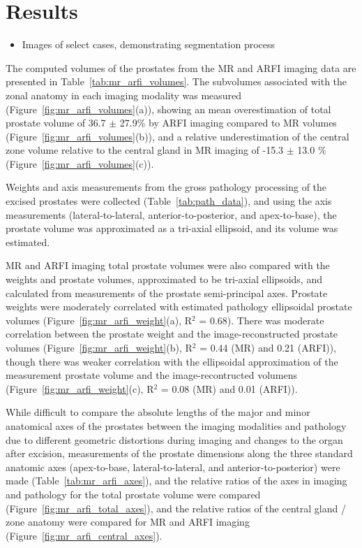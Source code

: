\section{Results}\label{sect:results}

\begin{itemize}
    \item Images of select cases, demonstrating segmentation process
\end{itemize}

The computed volumes of the prostates from the MR and ARFI imaging data are
presented in Table~\ref{tab:mr_arfi_volumes}.  The subvolumes associated
with the zonal anatomy in each imaging modality was measured
(Figure~\ref{fig:mr_arfi_volumes}(a)), showing an mean overestimation of
total prostate volume of 36.7 $\pm$ 27.9\% by ARFI imaging compared to MR
volumes (Figure~\ref{fig:mr_arfi_volumes}(b)), and a relative
underestimation of the central zone volume relative to the central gland in MR
imaging of -15.3 $\pm$ 13.0 \% (Figure~\ref{fig:mr_arfi_volumes}(c)).





Weights and axis measurements from the gross pathology processing of the
excised prostates were collected (Table~\ref{tab:path_data}), and using the
axis measurements (lateral-to-lateral, anterior-to-posterior, and
apex-to-base), the prostate volume was approximated as a tri-axial ellipsoid,
and its volume was estimated.



MR and ARFI imaging total prostate volumes were also compared with the weights
and prostate volumes, approximated to be tri-axial ellipsoids, and calculated
from measurements of the prostate semi-principal axes.  Prostate weights were
moderately correlated with estimated pathology ellipsoidal prostate volumes
(Figure~\ref{fig:mr_arfi_weight}(a), R$^2$ = 0.68).  There was moderate
correlation between the prostate weight and the image-reconstructed prostate
volumes (Figure~\ref{fig:mr_arfi_weight}(b), R$^2$ = 0.44 (MR) and 0.21
(ARFI)), though there was weaker correlation with the ellipsoidal approximation
of the measurement prostate volume and the image-recontructed volumens
(Figure~\ref{fig:mr_arfi_weight}(c), R$^2$ = 0.08 (MR) and 0.01 (ARFI)).  



While difficult to compare the absolute lengths of the major and minor
anatomical axes of the prostates between the imaging modalities and pathology
due to different geometric distortions during imaging and changes to the organ
after excision, measurements of the prostate dimensions along the three
standard anatomic axes (apex-to-base, lateral-to-lateral, and
anterior-to-posterior) were made (Table~\ref{tab:mr_arfi_axes}), and the
relative ratios of the axes in imaging and pathology for the total prostate
volume were compared (Figure~\ref{fig:mr_arfi_total_axes}), and the relative
ratios of the central gland / zone anatomy were compared for MR and ARFI
imaging (Figure~\ref{fig:mr_arfi_central_axes}).








